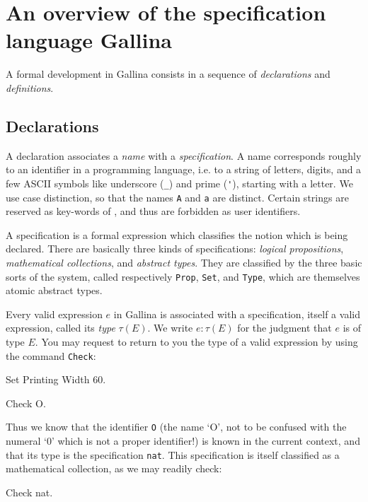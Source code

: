 \documentclass[11pt,a4paper]{book}
\begin{document}
\section{An overview of the specification language Gallina}

A formal development in Gallina consists in a sequence of {\sl declarations}
and {\sl definitions}.

\subsection{Declarations}

A declaration associates a {\sl name} with a {\sl specification}.
A name corresponds roughly to an identifier in a programming
language, i.e. to a string of letters, digits, and a few ASCII symbols like
underscore (\verb"_") and prime (\verb"'"), starting with a letter.
We use case distinction, so that the names \verb"A" and \verb"a" are distinct.
Certain strings are reserved as key-words of \Coq, and thus are forbidden
as user identifiers.

A specification is a formal expression which classifies the notion which is
being declared. There are basically three kinds of specifications:
{\sl logical propositions}, {\sl mathematical collections}, and
{\sl abstract types}. They are classified by the three basic sorts
of the system, called respectively \verb:Prop:, \verb:Set:, and
\verb:Type:, which are themselves atomic abstract types.

Every valid expression $e$ in Gallina is associated with a specification,
itself a valid expression, called its {\sl type} $\tau(E)$. We write
$e:\tau(E)$ for the judgment that $e$ is of type $E$.
You may request \Coq{} to return to you the type of a valid expression by using
the command \verb:Check::

\begin{coq_eval}
Set Printing Width 60.
\end{coq_eval}

\begin{coq_example}
Check O.
\end{coq_example}

Thus we know that the identifier \verb:O: (the name `O', not to be
confused with the numeral `0' which is not a proper identifier!) is
known in the current context, and that its type is the specification
\verb:nat:. This specification is itself classified as a mathematical
collection, as we may readily check:

\begin{coq_example}
Check nat.
\end{coq_example}
\end{document}
